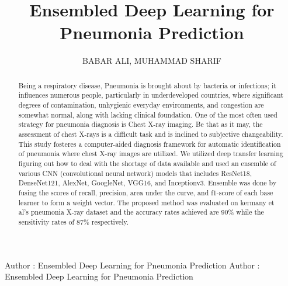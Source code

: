 \documentclass{ieeeaccess}
\begin{document}
\title{Ensembled Deep Learning for Pneumonia Prediction}
\author{\uppercase{Babar Ali},
\uppercase{Muhammad Sharif}}
\address[1]{Comsats University Islamabad Attock Campus, Punjab, Pakistan (e-mail: babaroscopy@gmail.com)}
\address[2]{Department of Computer Science, Comsats University Islamabad Attock Campus, Punjab, Pakistan (e-mail: sharif@cuiatk.edu.pk)}

\markboth
{Author \headeretal: Ensembled Deep Learning for Pneumonia Prediction}
{Author \headeretal: Ensembled Deep Learning for Pneumonia Prediction}


\begin{abstract}
 Being a respiratory disease, Pneumonia is brought about by bacteria or infections; it influences numerous people, particularly in underdeveloped countries, where significant degrees of contamination, unhygienic everyday environments, and congestion are somewhat normal, along with lacking clinical foundation. One of the most often used strategy for pneumonia diagnosis is Chest X-ray imaging. Be that as it may, the assessment of chest X-rays is a difficult task and is inclined to subjective changeability. This study fosteres a computer-aided diagnosis framework for automatic identification of pneumonia where chest X-ray images are utilized. We utilized deep transfer learning figuring out how to deal with the shortage of data available and used an ensemble of various CNN (convolutional neural network) models that includes ResNet18, DenseNet121, AlexNet, GoogleNet, VGG16, and Inceptionv3. Ensemble was done by fusing the scores of recall, precision, area under the curve, and f1-score of each base learner to form a weight vector. The proposed method was evaluated on kermany et al's pneumonia X-ray dataset and the accuracy rates achieved are 90\% while the sensitivity rates of 87\% respectively.
\end{abstract}

\titlepgskip=-15pt

\maketitle
\end{document}
